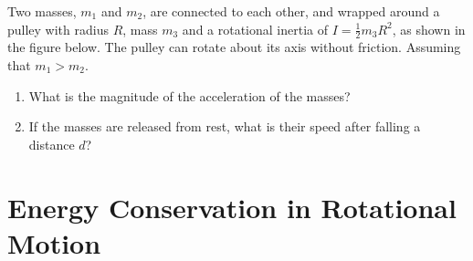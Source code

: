 \begin{example}
  \label{eg:2masses-pulley-dynamics}
  Two masses, $m_1$ and $m_2$, are connected to each other, and wrapped around
  a pulley with radius $R$, mass $m_3$ and a rotational inertia of
  $I=\frac12m_3R^2$, as shown in the figure below. The pulley can rotate about
  its axis without friction. Assuming that $m_1>m_2$.
  \begin{center}
  \end{center}
  \begin{enumerate}
  \item What is the magnitude of the acceleration of the masses?
  \item If the masses are released from rest, what is their speed after
    falling a distance $d$?
  \end{enumerate}
\end{example}




\section{Energy Conservation in Rotational Motion}

